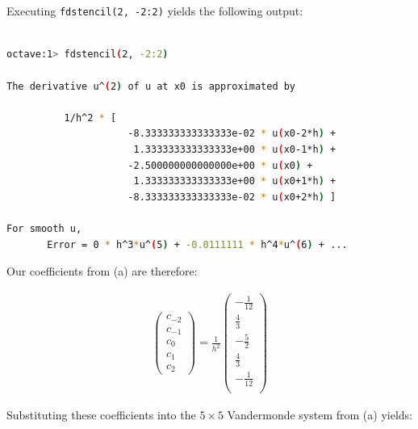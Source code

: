 \begin{solution}\ \\\\

    Executing \texttt{fdstencil(2, -2:2)} yields the following output: \\\\

    \begin{lstlisting}[language=bash]
octave:1> fdstencil(2, -2:2)
 
The derivative u^(2) of u at x0 is approximated by
 
          1/h^2 * [
                     -8.333333333333333e-02 * u(x0-2*h) + 
                      1.333333333333333e+00 * u(x0-1*h) + 
                     -2.500000000000000e+00 * u(x0) + 
                      1.333333333333333e+00 * u(x0+1*h) + 
                     -8.333333333333333e-02 * u(x0+2*h) ]   
 
For smooth u,
       Error = 0 * h^3*u^(5) + -0.0111111 * h^4*u^(6) + ...
    \end{lstlisting}

    Our coefficients from (a) are therefore:

    \begin{align*}
        \begin{pmatrix}
            c_{-2} \\ c_{-1} \\ c_0 \\ c_1 \\ c_2
        \end{pmatrix}
            = \frac{1}{h^2}
        \begin{pmatrix}
            -\frac{1}{12} \\
            \frac{4}{3} \\
            -\frac{5}{2} \\ 
            \frac{4}{3} \\
            -\frac{1}{12} \\
        \end{pmatrix}
    \end{align*}

    Substituting these coefficients into the $5 \times 5$ Vandermonde system from (a) yields:


\end{solution}
